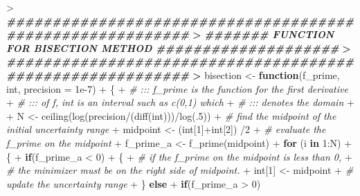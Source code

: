\documentclass[
]{article}
\newenvironment{Shaded}{\begin{snugshade}}{\end{snugshade}}
\newcommand{\AttributeTok}[1]{\textcolor[rgb]{0.77,0.63,0.00}{#1}}
\newcommand{\CommentTok}[1]{\textcolor[rgb]{0.56,0.35,0.01}{\textit{#1}}}
\newcommand{\ControlFlowTok}[1]{\textcolor[rgb]{0.13,0.29,0.53}{\textbf{#1}}}
\newcommand{\DecValTok}[1]{\textcolor[rgb]{0.00,0.00,0.81}{#1}}
\newcommand{\DocumentationTok}[1]{\textcolor[rgb]{0.56,0.35,0.01}{\textbf{\textit{#1}}}}
\newcommand{\ErrorTok}[1]{\textcolor[rgb]{0.64,0.00,0.00}{\textbf{#1}}}
\newcommand{\FloatTok}[1]{\textcolor[rgb]{0.00,0.00,0.81}{#1}}
\newcommand{\FunctionTok}[1]{\textcolor[rgb]{0.00,0.00,0.00}{#1}}
\newcommand{\NormalTok}[1]{#1}
\newcommand{\OtherTok}[1]{\textcolor[rgb]{0.56,0.35,0.01}{#1}}
\newcommand{\SpecialCharTok}[1]{\textcolor[rgb]{0.00,0.00,0.00}{#1}}
\begin{document}
\begin{Shaded}
\begin{Highlighting}[]
\SpecialCharTok{\textgreater{}} \DocumentationTok{\#\#\#\#\#\#\#\#\#\#\#\#\#\#\#\#\#\#\#\#\#\#\#\#\#\#\#\#\#\#\#\#\#\#\#\#\#\#\#\#\#\#\#\#\#\#\#\#\#\#\#\#\#\#\#\#\#\#}
\ErrorTok{\textgreater{}} \DocumentationTok{\#\#\#\#\#\#\# FUNCTION FOR BISECTION METHOD \#\#\#\#\#\#\#\#\#\#\#\#\#\#\#\#\#\#\#\#}
\ErrorTok{\textgreater{}} \DocumentationTok{\#\#\#\#\#\#\#\#\#\#\#\#\#\#\#\#\#\#\#\#\#\#\#\#\#\#\#\#\#\#\#\#\#\#\#\#\#\#\#\#\#\#\#\#\#\#\#\#\#\#\#\#\#\#\#\#\#\#}
\ErrorTok{\textgreater{}}\NormalTok{ bisection }\OtherTok{\textless{}{-}} \ControlFlowTok{function}\NormalTok{(f\_prime, int, }\AttributeTok{precision =} \FloatTok{1e{-}7}\NormalTok{)}
\SpecialCharTok{+}\NormalTok{ \{}
\SpecialCharTok{+}   \CommentTok{\# ::: f\_prime is the function for the first derivative}
\SpecialCharTok{+}   \CommentTok{\# ::: of f, int is an interval such as c(0,1) which }
\SpecialCharTok{+}   \CommentTok{\# ::: denotes the domain}
\SpecialCharTok{+}   
\SpecialCharTok{+}\NormalTok{   N }\OtherTok{\textless{}{-}} \FunctionTok{ceiling}\NormalTok{(}\FunctionTok{log}\NormalTok{(precision}\SpecialCharTok{/}\NormalTok{(}\FunctionTok{diff}\NormalTok{(int)))}\SpecialCharTok{/}\FunctionTok{log}\NormalTok{(.}\DecValTok{5}\NormalTok{))}
\SpecialCharTok{+}   \CommentTok{\# find the midpoint of the initial uncertainty range}
\SpecialCharTok{+}\NormalTok{   midpoint }\OtherTok{\textless{}{-}}\NormalTok{ (int[}\DecValTok{1}\NormalTok{]}\SpecialCharTok{+}\NormalTok{int[}\DecValTok{2}\NormalTok{]) }\SpecialCharTok{/}\DecValTok{2}
\SpecialCharTok{+}   \CommentTok{\# evaluate the f\_prime on the midpoint}
\SpecialCharTok{+}\NormalTok{   f\_prime\_a }\OtherTok{\textless{}{-}} \FunctionTok{f\_prime}\NormalTok{(midpoint)}
\SpecialCharTok{+}   \ControlFlowTok{for}\NormalTok{ (i }\ControlFlowTok{in} \DecValTok{1}\SpecialCharTok{:}\NormalTok{N)}
\SpecialCharTok{+}\NormalTok{   \{}
\SpecialCharTok{+}     \ControlFlowTok{if}\NormalTok{(f\_prime\_a }\SpecialCharTok{\textless{}} \DecValTok{0}\NormalTok{)}
\SpecialCharTok{+}\NormalTok{     \{}
\SpecialCharTok{+}       \CommentTok{\# if the f\_prime on the midpoint is less than 0,}
\SpecialCharTok{+}       \CommentTok{\# the minimizer must be on the right side of midpoint.}
\SpecialCharTok{+}\NormalTok{       int[}\DecValTok{1}\NormalTok{] }\OtherTok{\textless{}{-}}\NormalTok{ midpoint}
\SpecialCharTok{+}       \CommentTok{\# update the uncertainty range}
\SpecialCharTok{+}\NormalTok{     \} }\ControlFlowTok{else}
\SpecialCharTok{+}       \ControlFlowTok{if}\NormalTok{(f\_prime\_a }\SpecialCharTok{\textgreater{}} \DecValTok{0}\NormalTok{)}

\end{Highlighting}
\end{Shaded}
\end{document}
